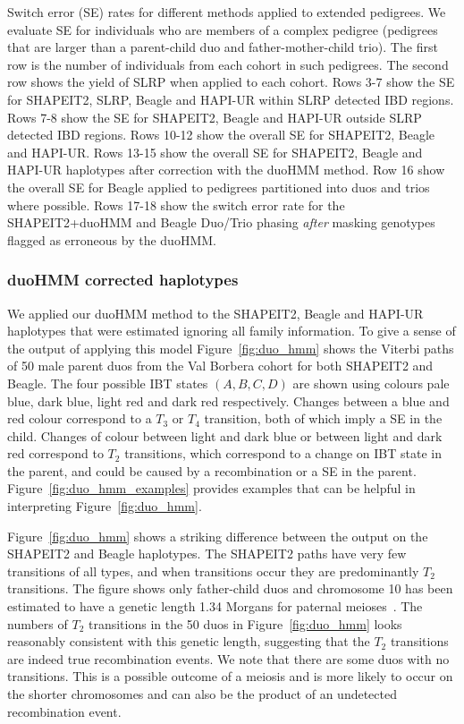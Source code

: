 \begin{table}[h]
\begin{center}
\caption[Switch error rates in large pedigrees]{Switch error (SE) rates for different methods applied to extended pedigrees.  We evaluate SE for individuals who are members of a complex pedigree (pedigrees that are larger than a parent-child duo and father-mother-child trio). The first row is the number of individuals from each cohort in such pedigrees.  The second row shows the yield of SLRP when applied to each cohort. Rows 3-7 show the SE for SHAPEIT2, SLRP, Beagle and HAPI-UR within SLRP detected IBD regions. Rows 7-8 show the SE for SHAPEIT2, Beagle and HAPI-UR outside SLRP detected IBD regions. Rows 10-12 show the overall SE for SHAPEIT2, Beagle and HAPI-UR. Rows 13-15 show the overall SE for SHAPEIT2, Beagle and HAPI-UR haplotypes after correction with the duoHMM method. Row 16 show the overall SE for  Beagle applied to pedigrees partitioned into duos and trios where possible. Rows 17-18 show the switch error rate for the SHAPEIT2+duoHMM and Beagle Duo/Trio phasing \emph{after} masking genotypes flagged as erroneous by the duoHMM.\label{tab:switch_tab2}}
\end{center}
\end{table}

 \subsubsection{duoHMM corrected haplotypes}
We applied our duoHMM method to the SHAPEIT2, Beagle and HAPI-UR haplotypes that were estimated ignoring all family information. To give a sense of the output of applying this model Figure~\ref{fig:duo_hmm}  shows the Viterbi paths of 50 male parent duos from the Val Borbera cohort for both SHAPEIT2 and Beagle. The four possible IBT states $(A,B,C,D)$ are shown using colours pale blue, dark blue, light red and dark red respectively. Changes between a blue and red colour correspond to a $T_3$ or $T_4$ transition, both of which imply a SE in the child. Changes of colour between light and dark blue or between light and dark red correspond to $T_2$ transitions, which correspond to a change on IBT state in the parent, and could be caused by a recombination or a SE in the parent. Figure~\ref{fig:duo_hmm_examples} provides examples that can be helpful in interpreting Figure~\ref{fig:duo_hmm}. 

Figure~\ref{fig:duo_hmm} shows a striking difference between the output on the SHAPEIT2 and Beagle haplotypes. The SHAPEIT2 paths have very few transitions of all types, and when transitions occur they are predominantly $T_2$ transitions. The figure shows only father-child duos and chromosome 10 has been estimated to have a genetic length 1.34 Morgans for paternal meioses~\citep{kong2002}. The numbers of $T_2$ transitions in the 50 duos in Figure~\ref{fig:duo_hmm} looks reasonably consistent with this genetic length, suggesting that the $T_2$ transitions are indeed true recombination events. We note that there are some duos with no transitions. This is a possible outcome of a meiosis and is more likely to occur on the shorter chromosomes and can also be the product of an undetected recombination event.

